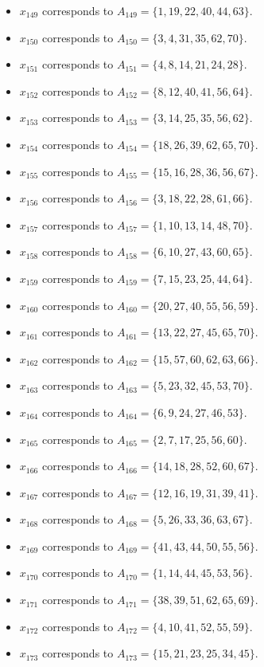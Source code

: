 \documentclass[11pt]{article}
\begin{document}
\begin{itemize}
\item $x_{149}$ corresponds to $A_{149}=\{1, 19, 22, 40, 44, 63\}$.
\item $x_{150}$ corresponds to $A_{150}=\{3, 4, 31, 35, 62, 70\}$.
\item $x_{151}$ corresponds to $A_{151}=\{4, 8, 14, 21, 24, 28\}$.
\item $x_{152}$ corresponds to $A_{152}=\{8, 12, 40, 41, 56, 64\}$.
\item $x_{153}$ corresponds to $A_{153}=\{3, 14, 25, 35, 56, 62\}$.
\item $x_{154}$ corresponds to $A_{154}=\{18, 26, 39, 62, 65, 70\}$.
\item $x_{155}$ corresponds to $A_{155}=\{15, 16, 28, 36, 56, 67\}$.
\item $x_{156}$ corresponds to $A_{156}=\{3, 18, 22, 28, 61, 66\}$.
\item $x_{157}$ corresponds to $A_{157}=\{1, 10, 13, 14, 48, 70\}$.
\item $x_{158}$ corresponds to $A_{158}=\{6, 10, 27, 43, 60, 65\}$.
\item $x_{159}$ corresponds to $A_{159}=\{7, 15, 23, 25, 44, 64\}$.
\item $x_{160}$ corresponds to $A_{160}=\{20, 27, 40, 55, 56, 59\}$.
\item $x_{161}$ corresponds to $A_{161}=\{13, 22, 27, 45, 65, 70\}$.
\item $x_{162}$ corresponds to $A_{162}=\{15, 57, 60, 62, 63, 66\}$.
\item $x_{163}$ corresponds to $A_{163}=\{5, 23, 32, 45, 53, 70\}$.
\item $x_{164}$ corresponds to $A_{164}=\{6, 9, 24, 27, 46, 53\}$.
\item $x_{165}$ corresponds to $A_{165}=\{2, 7, 17, 25, 56, 60\}$.
\item $x_{166}$ corresponds to $A_{166}=\{14, 18, 28, 52, 60, 67\}$.
\item $x_{167}$ corresponds to $A_{167}=\{12, 16, 19, 31, 39, 41\}$.
\item $x_{168}$ corresponds to $A_{168}=\{5, 26, 33, 36, 63, 67\}$.
\item $x_{169}$ corresponds to $A_{169}=\{41, 43, 44, 50, 55, 56\}$.
\item $x_{170}$ corresponds to $A_{170}=\{1, 14, 44, 45, 53, 56\}$.
\item $x_{171}$ corresponds to $A_{171}=\{38, 39, 51, 62, 65, 69\}$.
\item $x_{172}$ corresponds to $A_{172}=\{4, 10, 41, 52, 55, 59\}$.
\item $x_{173}$ corresponds to $A_{173}=\{15, 21, 23, 25, 34, 45\}$.

\end{itemize}
\end{document}
